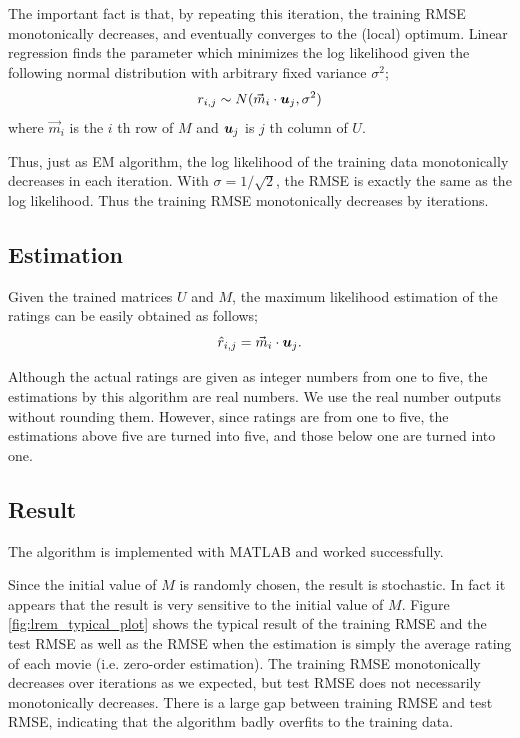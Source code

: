 \documentclass{article}
\begin{document}
The important fact is that, by repeating this iteration, the training RMSE monotonically decreases, and eventually converges to the (local) optimum. Linear regression finds the parameter which minimizes the log likelihood given the following normal distribution with arbitrary fixed variance $\sigma^2$;
\begin{equation}
r_{i,j}\sim N(\vec{m}_i \cdot {{\mbox{\boldmath $u$}}}_j, \sigma^2)
\end{equation}
where $\vec{m}_i$ is the $i$ th row of $M$ and ${{\mbox{\boldmath $u$}}}_j$ is $j$ th column of $U$.

Thus, just as EM algorithm, the log likelihood of the training data monotonically decreases in each iteration. With $\sigma = 1/\sqrt{2}$, the RMSE is exactly the same as the log likelihood. Thus the training RMSE monotonically decreases by iterations.

\subsection{Estimation}
Given the trained matrices $U$ and $M$, the maximum likelihood estimation of the ratings can be easily obtained as follows;
\begin{equation}
\hat{r}_{i,j}=\vec{m}_i \cdot {{\mbox{\boldmath $u$}}}_j.
\end{equation}

Although the actual ratings are given as integer numbers from one to five, the estimations by this algorithm are real numbers. We use the real number outputs without rounding them. However, since ratings are from one to five, the estimations above five are turned into five, and those below one are turned into one. %

\subsection{Result}

The algorithm is implemented with MATLAB and worked successfully.

Since the initial value of $M$ is randomly chosen, the result is stochastic. In fact it appears that the result is very sensitive to the initial value of $M$. Figure \ref{fig:lrem_typical_plot} shows the typical result of the training RMSE and the test RMSE as well as the RMSE when the estimation is simply the average rating of each movie (i.e. zero-order estimation). The training RMSE monotonically decreases over iterations as we expected, but test RMSE does not necessarily monotonically decreases. There is a large gap between training RMSE and test RMSE, indicating that the algorithm badly overfits to the training data.
\end{document}
